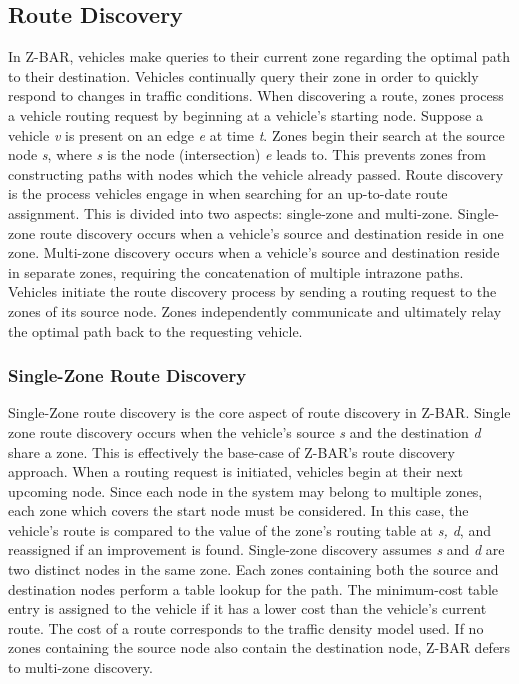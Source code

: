 \documentclass[12pt,conference]{IEEEtran}
\begin{document}
\subsection{Route Discovery}

In Z-BAR, vehicles make queries to their current zone regarding the optimal path to their destination. Vehicles continually query their zone in order to quickly respond to changes in traffic conditions. When discovering a route, zones process a vehicle routing request by beginning at a vehicle's starting node. Suppose a vehicle \textit{v} is present on an edge \textit{e} at time \textit{t}. Zones begin their search at the source node \textit{s}, where \textit{s} is the node (intersection) \textit{e} leads to. This prevents zones from constructing paths with nodes which the vehicle already passed. Route discovery is the process vehicles engage in when searching for an up-to-date route assignment. This is divided into two aspects: single-zone and multi-zone. Single-zone route discovery occurs when a vehicle's source and destination reside in one zone. Multi-zone discovery occurs when a vehicle's source and destination reside in separate zones, requiring the concatenation of multiple intrazone paths. Vehicles initiate the route discovery process by sending a routing request to the zones of its source node. Zones independently communicate and ultimately relay the optimal path back to the requesting vehicle.

\subsubsection{Single-Zone Route Discovery}

Single-Zone route discovery is the core aspect of route discovery in Z-BAR. Single zone route discovery occurs when the vehicle's source \textit{s} and the destination \textit{d} share a zone. This is effectively the base-case of Z-BAR's route discovery approach. When a routing request is initiated, vehicles begin at their next upcoming node. Since each node in the system may belong to multiple zones, each zone which covers the start node must be considered. In this case, the vehicle's route is compared to the value of the zone's routing table at \textit{s, d}, and reassigned if an improvement is found.
Single-zone discovery assumes \textit{s} and \textit{d} are two distinct nodes in the same zone. Each zones containing both the source and destination nodes perform a table lookup for the path. The minimum-cost table entry is assigned to the vehicle if it has a lower cost than the vehicle's current route. The cost of a route corresponds to the traffic density model used. If no zones containing the source node also contain the destination node, Z-BAR defers to multi-zone discovery.
\end{document}
